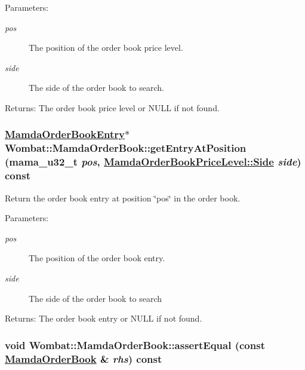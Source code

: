 \begin{Desc}
\item[Parameters:]
\begin{description}
\item[{\em pos}]The position of the order book price level. \item[{\em side}]The side of the order book to search. \end{description}
\end{Desc}
\begin{Desc}
\item[Returns:]The order book price level or NULL if not found. \end{Desc}
\hypertarget{classWombat_1_1MamdaOrderBook_f220bb5858948b27e5fd02229dffb30c}{
\subsubsection[getEntryAtPosition]{\setlength{\rightskip}{0pt plus 5cm}\hyperlink{classWombat_1_1MamdaOrderBookEntry}{Mamda\-Order\-Book\-Entry}$\ast$ Wombat::Mamda\-Order\-Book::get\-Entry\-At\-Position (mama\_\-u32\_\-t {\em pos}, \hyperlink{classWombat_1_1MamdaOrderBookPriceLevel_384c34b0a74d874b8969dee9b0d3718d}{Mamda\-Order\-Book\-Price\-Level::Side} {\em side}) const}}
\label{classWombat_1_1MamdaOrderBook_f220bb5858948b27e5fd02229dffb30c}


Return the order book entry at position \char`\"{}pos\char`\"{} in the order book. 

\begin{Desc}
\item[Parameters:]
\begin{description}
\item[{\em pos}]The position of the order book entry. \item[{\em side}]The side of the order book to search \end{description}
\end{Desc}
\begin{Desc}
\item[Returns:]The order book entry or NULL if not found. \end{Desc}
\hypertarget{classWombat_1_1MamdaOrderBook_bf398229e189a73311d14fc5765c28de}{
\subsubsection[assertEqual]{\setlength{\rightskip}{0pt plus 5cm}void Wombat::Mamda\-Order\-Book::assert\-Equal (const \hyperlink{classWombat_1_1MamdaOrderBook}{Mamda\-Order\-Book} \& {\em rhs}) const}}
\label{classWombat_1_1MamdaOrderBook_bf398229e189a73311d14fc5765c28de}


